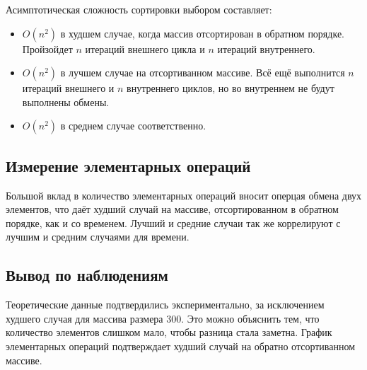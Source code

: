 \documentclass[11pt]{article}
\begin{document}
\begin{center}
\end{center}
{ \hspace*{\fill} }

Асимптотическая сложность сортировки выбором составляет:
\begin{itemize}
    \item $O(n^2)$ в худшем случае, когда массив отсортирован в обратном порядке. Пройзойдет $n$
          итераций внешнего цикла и $n$ итераций внутреннего.
    \item $O(n^2)$ в лучшем случае на отсортиванном массиве. Всё ещё выполнится $n$ итераций
          внешнего и $n$ внутреннего циклов, но во внутреннем не будут выполнены обмены.
    \item $O(n^2)$ в среднем случае соответственно.
\end{itemize}

\subsection{Измерение элементарных операций}

\begin{center}
\end{center}
{ \hspace*{\fill} }

\begin{center}
\end{center}
{ \hspace*{\fill} }

Большой вклад в количество элементарных операций вносит оперцая обмена двух элементов,
что даёт худший случай на массиве, отсортированном в обратном порядке, как и со временем.
Лучший и средние случаи так же коррелируют с лучшим и средним случаями для времени.

\subsection{Вывод по наблюдениям}
Теоретические данные подтвердились экспериментально, за исключением худшего случая для массива размера 300.
Это можно объяснить тем, что количество элементов слишком мало, чтобы разница стала заметна. График элементарных операций
подтверждает худший случай на обратно отсортиванном массиве.
\end{document}
